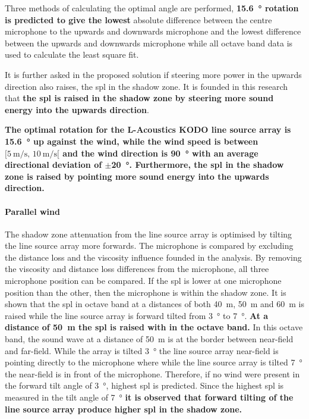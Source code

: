 Three methods of calculating the optimal angle are performed, \textbf{\SI{15.6}{\degree} rotation is predicted to give the lowest} absolute difference between the centre microphone to the upwards and downwards microphone and the lowest difference between the upwards and downwards microphone while all octave band data is used to calculate the least square fit.

It is further asked in the proposed solution if steering more power in the upwards direction also raises, the \gls{spl} in the shadow zone. It is founded in this research that  \textbf{the \gls{spl} is raised in the shadow zone by steering more sound energy into the upwards direction}.

\textbf{ The optimal rotation for the L-Acoustics KODO line source array is \SI{15.6}{\degree} up against the wind, while the wind speed is between $[\SI{5}{\meter\per\second},\, \SI{10}{\meter\per\second}[ $ and the wind direction is \SI{90}{\degree} with an average directional deviation of $\pm$\SI{20}{\degree}. Furthermore, the \gls{spl} in the shadow zone is raised by pointing more sound energy into the upwards direction. } 





\paragraph{Parallel wind}
The shadow zone attenuation from the line source array is optimised by tilting the line source array more forwards. The microphone is compared by excluding the distance loss and the viscosity influence founded in the analysis. By removing the viscosity and distance loss differences from the microphone, all three microphone position can be compared. If the \gls{spl} is lower at one microphone position than the other, then the microphone is within the shadow zone. It is shown that the \gls{spl} in octave band at a distances of both \SI{40}{\meter}, \SI{50}{\meter} and \SI{60}{\meter} is raised while the line source array is forward tilted from \SI{3}{\degree} to \SI{7}{\degree}. \textbf{At a distance of \SI{50}{\meter} the \gls{spl} is raised with  in the  octave band.} In this octave band, the sound wave at a distance of \SI{50}{\meter} is at the border between near-field and far-field. While the array is tilted \SI{3}{\degree} the line source array near-field is pointing directly to the microphone where while the line source array is tilted \SI{7}{\degree} the near-field is in front of the microphone. Therefore, if no wind were present in the forward tilt angle of \SI{3}{\degree}, highest \gls{spl} is predicted. Since the highest \gls{spl} is measured in the tilt angle of \SI{7}{\degree} \textbf{ it is observed that forward tilting of the line source array produce higher \gls{spl} in the shadow zone.} 

